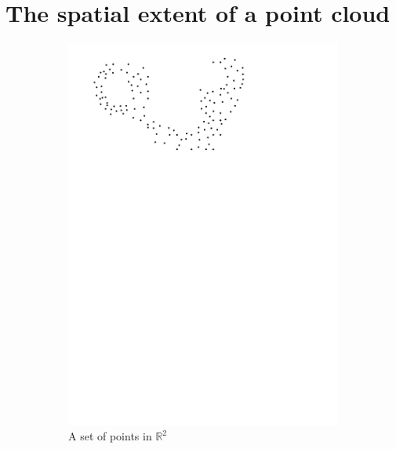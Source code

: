 
\graphicspath{{spatialextent/}}

\chapter{The spatial extent of a point cloud}
\label{chap:spatialextent}

\begin{figure}[h]
  \centering
  \begin{subfigure}[b]{0.21\linewidth}
    \centering
    \includegraphics[page=1,width=\textwidth]{figs/idea.pdf}
    \caption{A set of points in $\mathbb{R}^2$}
  \end{subfigure}%
  \qquad
  \begin{subfigure}[b]{0.21\linewidth}
    \centering

\end{subfigure}
\end{figure}
